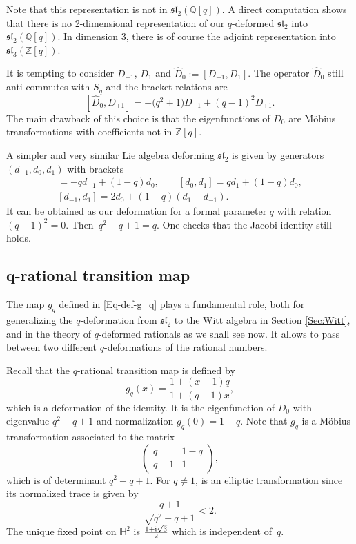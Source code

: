 \documentclass[pdftex]{sigma}
\numberwithin{equation}{section}
\renewcommand*{\H}{\mathbb{H}}
\newcommand*{\Z}{\mathbb{Z}}
\begin{document}
Note that this representation is not in $\mathfrak{sl}_2(\mathbb{Q}[q])$. A direct computation shows that there is no 2-dimensional representation of our $q$-deformed $\mathfrak{sl}_2$ into $\mathfrak{sl}_2(\mathbb{Q}[q])$. In dimension 3, there is of course the adjoint representation into $\mathfrak{sl}_3(\Z[q])$.

\begin{Remark}
It is tempting to consider $D_{-1}$, $D_1$ and $\widehat{D}_0:=[D_{-1},D_1]$. The operator $\widehat{D}_0$ still anti-commutes with $S_q$ and the bracket relations are
\[
[\widehat{D}_0,D_{\pm 1}]=\pm \big(q^2+1\big)D_{\pm 1}\pm (q-1)^2D_{\mp 1}.\]
The main drawback of this choice is that the eigenfunctions of $\widehat{D}_0$ are M\"obius transformations with coefficients not in $\Z[q]$.
\end{Remark}

\begin{Remark}\label{Rk:mod-square}
A simpler and very similar Lie algebra deforming $\mathfrak{sl}_2$ is given by generators $(d_{-1},d_0,d_1)$ with brackets
\begin{gather*}
[d_0,d_{-1}]= -qd_{-1} + (1 - q)d_0, \qquad [d_0,d_1]=qd_1 + (1 - q)d_0,\\ [d_{-1},d_{1}]=2d_0 + (1 - q)(d_{1} - d_{-1}).
\end{gather*}
It can be obtained as our deformation for a formal parameter $q$ with relation $(q-1)^2=0$. Then~${q^2-q+1=q}$. One checks that the Jacobi identity still holds.
\end{Remark}


\subsection[q-rational transition map]{$\boldsymbol{q}$-rational transition map}\label{Sec:Ovsienko}

The map $g_q$ defined in \eqref{Eq-def-g_q} plays a fundamental role, both for generalizing the $q$-deformation from $\mathfrak{sl}_2$ to the Witt algebra in Section \ref{Sec:Witt}, and in the theory of $q$-deformed rationals as we shall see now. It allows to pass between two different $q$-deformations of the rational numbers.

Recall that the $q$-rational transition map is defined by
\[
g_q(x)=\frac{1+(x-1)q}{1+(q-1)x},
\]
which is a deformation of the identity. It is the eigenfunction of $D_0$ with eigenvalue $q^2-q+1$ and normalization $g_q(0)=1-q$.
Note that $g_q$ is a M\"obius transformation associated to the matrix
\[
\begin{pmatrix} q & 1-q \\ q-1 & 1\end{pmatrix},
\]
which is of determinant $q^2-q+1$. For $q\neq 1$,  is an elliptic transformation since its normalized trace is given by
\[
\frac{q+1}{\sqrt{q^2-q+1}}<2.
\] The unique fixed point on $\H^2$ is $\tfrac{1+{\rm i}\sqrt{3}}{2}$ which is independent of~$q$.
\end{document}
